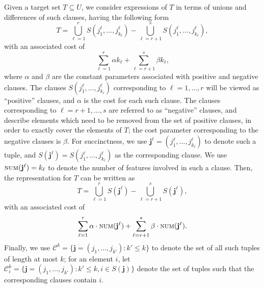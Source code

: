 
Given a target set $T\subseteq U$,
we consider expressions of $T$ in terms of unions and differences of such clauses,
having the following form
\[
T = \bigcup_{\ell=1}^r S(j^{\ell}_1,\ldots,j^{\ell}_{k_{\ell}}) - 
 \bigcup_{\ell=r+1}^s S(j^{\ell}_1,\ldots,j^{\ell}_{k_{\ell}}),
\]
with an associated cost of
\[
\sum_{\ell=1}^r \alpha k_{\ell} + \sum_{\ell=r+1}^s \beta k_{\ell},
\]
where $\alpha$ and $\beta$ are the constant parameters associated with positive
and negative clauses.
The clauses $S(j^{\ell}_1,\ldots,j^{\ell}_{k_{\ell}})$ corresponding to $\ell=1,\ldots,r$
will be viewed as ``positive'' clauses, and $\alpha$ is the cost for each such clause.
The clauses corresponding to $\ell=r+1,\ldots,s$ are referred to as ``negative'' clauses, 
and describe elements which need to be removed from the set of positive clauses, in order to
exactly cover the elements of $T$; the cost parameter corresponding to the negative
clauses is $\beta$.  
For succinctness, we use $\mathbf{j}^{\ell}=(j^{\ell}_1,\ldots,j^{\ell}_{k_{\ell}})$ to denote
such a tuple, and $S(\mathbf{j}^{\ell}) = S(j^{\ell}_1,\ldots,j^{\ell}_{k_{\ell}})$ as the
corresponding clause. We use $\textsc{num}(\mathbf{j}^{\ell})=k_{\ell}$ to denote the
number of features involved in such a clause. Then, the representation for $T$
can be written as 
\[
T = \bigcup_{\ell=1}^r S(\mathbf{j}^{\ell}) - \bigcup_{\ell=r+1}^s S(\mathbf{j}^{\ell}),
\]
with an associated cost of 
\[
\sum_{\ell=1}^r \alpha\cdot \textsc{num}(\mathbf{j}^{\ell}) + \sum_{\ell=r+1}^s \beta\cdot \textsc{num}(\mathbf{j}^{\ell}).
\]
Finally, we use $\mathcal{C}^k=\{\mathbf{j}=(j_1,\ldots,j_{k'}): k'\leq k\}$ to denote
the set of all such tuples of length at most $k$;
for an element $i$, let $\mathcal{C}^k_i=\{\mathbf{j}=(j_1,\ldots,j_{k'}): k'\leq k, i\in S(\mathbf{j})\}$
denote the set of tuples such that the corresponding clauses contain $i$. 

